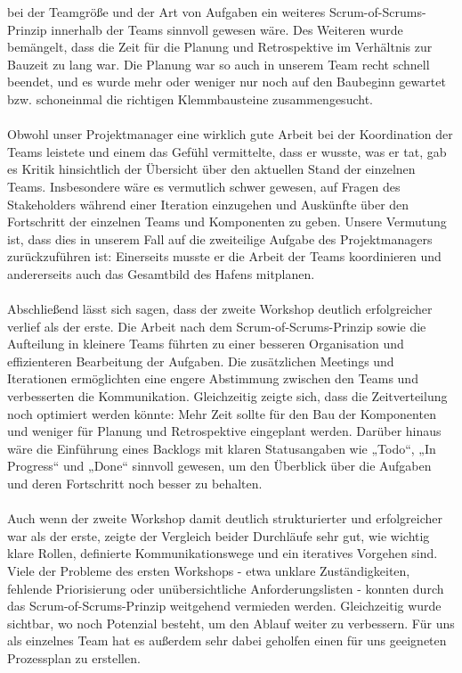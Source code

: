 \documentclass{article}
\begin{document}
bei der Teamgröße und der Art von Aufgaben ein weiteres Scrum-of-Scrums-Prinzip
innerhalb der Teams sinnvoll gewesen wäre. Des Weiteren wurde bemängelt, dass die
Zeit für die Planung und Retrospektive im Verhältnis zur Bauzeit zu lang war. Die
Planung war so auch in unserem Team recht schnell beendet, und es wurde mehr oder
weniger nur noch auf den Baubeginn gewartet bzw. schoneinmal die richtigen Klemmbausteine zusammengesucht.
\\
\\
Obwohl unser Projektmanager eine wirklich gute Arbeit bei der Koordination der Teams
leistete und einem das Gefühl vermittelte, dass er wusste, was er tat, gab es Kritik
hinsichtlich der Übersicht über den aktuellen Stand der einzelnen Teams. Insbesondere
wäre es vermutlich schwer gewesen, auf Fragen des Stakeholders während einer
Iteration einzugehen und Auskünfte über den Fortschritt der einzelnen Teams und
Komponenten zu geben. Unsere Vermutung ist, dass dies in unserem Fall auf die zweiteilige Aufgabe des 
Projektmanagers zurückzuführen ist: Einerseits musste er die Arbeit der Teams koordinieren und
andererseits auch das Gesamtbild des Hafens mitplanen. 
\\
\\
Abschließend lässt sich sagen, dass der zweite Workshop deutlich erfolgreicher verlief als der erste. Die Arbeit nach dem Scrum-of-Scrums-Prinzip sowie die Aufteilung in kleinere Teams führten zu einer besseren Organisation und effizienteren Bearbeitung der Aufgaben. Die zusätzlichen Meetings und Iterationen ermöglichten eine engere Abstimmung zwischen den Teams und verbesserten die Kommunikation. Gleichzeitig zeigte sich, dass die Zeitverteilung noch optimiert werden könnte: Mehr Zeit sollte für den Bau der Komponenten und weniger für Planung und Retrospektive eingeplant werden.
Darüber hinaus wäre die Einführung eines Backlogs mit klaren Statusangaben wie „Todo“, „In Progress“
und „Done“ sinnvoll gewesen, um den Überblick über die Aufgaben und deren Fortschritt noch besser zu behalten.
\\
\\
Auch wenn der zweite Workshop damit deutlich strukturierter und erfolgreicher war als der erste, zeigte der Vergleich beider Durchläufe sehr gut, wie wichtig klare Rollen, definierte Kommunikationswege und ein iteratives Vorgehen sind. Viele der Probleme des ersten Workshops - etwa unklare Zuständigkeiten, fehlende Priorisierung oder unübersichtliche Anforderungslisten - konnten durch das Scrum-of-Scrums-Prinzip weitgehend vermieden werden. Gleichzeitig wurde sichtbar, wo noch Potenzial besteht, um den Ablauf weiter zu verbessern. Für uns als 
einzelnes Team hat es außerdem sehr dabei geholfen einen für uns geeigneten Prozessplan zu erstellen.
\end{document}
